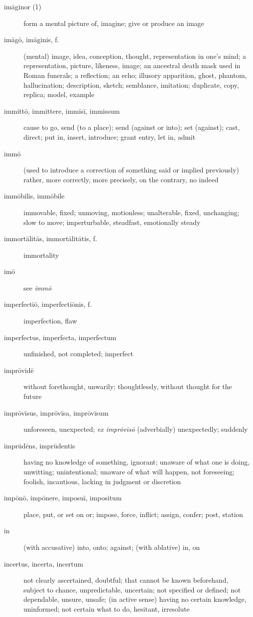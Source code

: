 \begin{description}
    \item[imāginor (1)] form a mental picture of, imagine; give or produce an image
    \item[imāgō, imāginis, f.] (mental) image, idea, conception, thought, representation in one's mind; a representation, picture, likeness, image; an ancestral death mask used in Roman funerals; a reflection; an echo; illusory apparition, ghost, phantom, hallucination; description, sketch; semblance, imitation; duplicate, copy, replica; model, example
    \item[immittō, immittere, immīsī, immissum] cause to go, send (to a place); send (against or into); set (against); cast, direct; put in, insert, introduce; grant entry, let in, admit
    \item[immō] \marginnote{*}(used to introduce a correction of something said or implied previously) rather, more correctly, more precisely, on the contrary, no indeed
    \item[immōbilis, immōbile] immovable, fixed; unmoving, motionless; unalterable, fixed, unchanging; slow to move; imperturbable, steadfast, emotionally steady
    \item[immortālitās, immortālitātis, f.] immortality
    \item[imō] see \textit{immō}
    \item[imperfectiō, imperfectiōnis, f.] imperfection, flaw
    \item[imperfectus, imperfecta, imperfectum] unfinished, not completed; imperfect
    \item[imprōvidē] without forethought, unwarily; thoughtlessly, without thought for the future
    \item[imprōvīsus, imprōvīsa, imprōvīsum] unforeseen, unexpected; \textit{ex imprōvīsō} (adverbially) unexpectedly; suddenly
    \item[imprūdēns, imprūdentis] having no knowledge of something, ignorant; unaware of what one is doing, unwitting; unintentional; unaware of what will happen, not foreseeing; foolish, incautious, lacking in judgment or discretion
    \item[impōnō, impōnere, imposuī, impositum] \marginnote{*}place, put, or set on or; impose, force, inflict; assign, confer; post, station
    \item[in] \marginnote{*}(with accusative) into, onto; against; (with ablative) in, on
    \item[incertus, incerta, incertum] not clearly ascertained, doubtful; that cannot be known beforehand, subject to chance, unpredictable, uncertain; not specified or defined; not dependable, unsure, unsafe; (in active sense) having no certain knowledge, uninformed; not certain what to do, hesitant, irresolute

\end{description}
